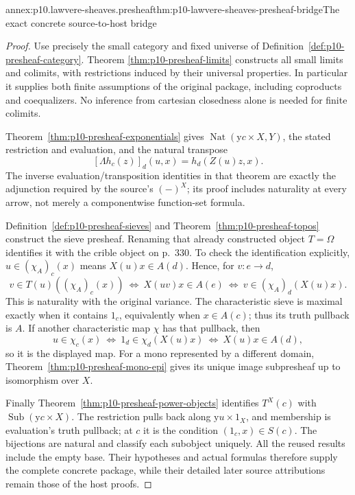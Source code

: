 \begin{annexitem}{annex:p10.lawvere-sheaves.presheaf}{thm:p10-lawvere-sheaves-presheaf-bridge}{The exact concrete source-to-host bridge}
\begin{proof}
Use precisely the small category and fixed universe of
Definition~\ref{def:p10-presheaf-category}.  Theorem
\ref{thm:p10-presheaf-limits} constructs all small limits and colimits,
with restrictions induced by their universal properties.  In
particular it supplies both finite assumptions of the original
package, including coproducts and coequalizers.  No inference from
cartesian closedness alone is needed for finite colimits.

Theorem~\ref{thm:p10-presheaf-exponentials} gives
\(\operatorname{Nat}(\mathrm y c\times X,Y)\), the stated
restriction and evaluation, and the natural transpose
\[
 [\Lambda h_c(z)]_d(u,x)=h_d(Z(u)z,x).
\]
The inverse evaluation/transposition identities in that theorem are
exactly the adjunction required by the source's \((-)^X\); its
proof includes naturality at every arrow, not merely a componentwise
function-set formula.

Definition~\ref{def:p10-presheaf-sieves} and
Theorem~\ref{thm:p10-presheaf-topos} construct the sieve presheaf.
Renaming that already constructed object \(T=\Omega\) identifies
it with the crible object on p.~330.  To check the identification
explicitly, \(u\in(\chi_A)_c(x)\) means
\(X(u)x\in A(d)\).  Hence, for \(v:e\to d\),
\[
 v\in T(u)((\chi_A)_c(x))
 \ \Longleftrightarrow\ X(uv)x\in A(e)
 \ \Longleftrightarrow\ v\in(\chi_A)_d(X(u)x).
\]
This is naturality with the original variance.  The characteristic
sieve is maximal exactly when it contains \(1_c\), equivalently
when \(x\in A(c)\); thus its truth pullback is \(A\).
If another characteristic map \(\chi\) has that pullback, then
\[
 u\in\chi_c(x)
 \ \Longleftrightarrow\ 1_d\in\chi_d(X(u)x)
 \ \Longleftrightarrow\ X(u)x\in A(d),
\]
so it is the displayed map.  For a mono represented by a different
domain, Theorem~\ref{thm:p10-presheaf-mono-epi} gives its unique
image subpresheaf up to isomorphism over \(X\).

Finally Theorem~\ref{thm:p10-presheaf-power-objects} identifies
\(T^X(c)\) with \(\operatorname{Sub}(\mathrm y c\times X)\).
The restriction pulls back along \(\mathrm y u\times1_X\),
and membership is evaluation's truth pullback; at \(c\) it is
the condition \((1_c,x)\in S(c)\).  The bijections are natural
and classify each subobject uniquely.  All the reused results include
the empty base.  Their hypotheses and actual formulas therefore
supply the complete concrete package, while their detailed later
source attributions remain those of the host proofs.
\end{proof}
\end{annexitem}

